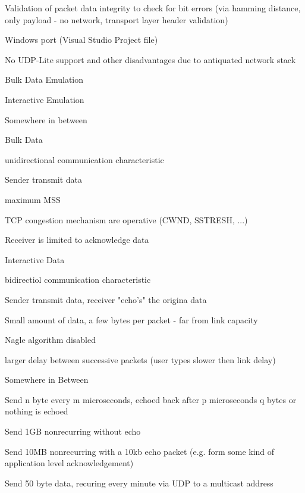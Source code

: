 \documentclass[9pt]{article}
\begin{document}
\begin{slide}
\bi
	\item Validation of packet data integrity to check for bit errors (via hamming distance, only payload - no network, transport
	layer header validation)
	\item Windows port (Visual Studio Project file)
	\bi
		\item No UDP-Lite support and other disadvantages due to antiquated network stack
	\ei
\ei
\end{slide}


\begin{slide}
\bi
	\item 
\ei
\end{slide}


\begin{slide}
\bi
	\item Bulk Data Emulation
	\item Interactive Emulation
	\item Somewhere in between
	\item Bulk Data
	\bi
		\item unidirectional communication characteristic
		\item Sender transmit data
		\item maximum MSS
		\item TCP congestion mechanism are operative (CWND, SSTRESH, ...)
		\item Receiver is limited to acknowledge data
	\ei
	\item Interactive Data
	\bi
		\item bidirectiol communication characteristic
		\item Sender transmit data, receiver "echo's" the origina data
		\item Small amount of data, a few bytes per packet -  far from link capacity
		\item Nagle algorithm disabled
		\item larger delay between successive packets (user types slower then link delay)
	\ei
	\item Somewhere in Between
	\bi
		\item Send n byte every m microseconds, echoed back after p microseconds q bytes or nothing is echoed
		\item Send 1GB nonrecurring without echo
		\item Send 10MB nonrecurring with a 10kb echo packet (e.g. form some kind of application level acknowledgement)
		\item Send 50 byte data, recuring every minute via UDP to a multicast address
	\ei
\ei
\end{slide}
\end{document}
